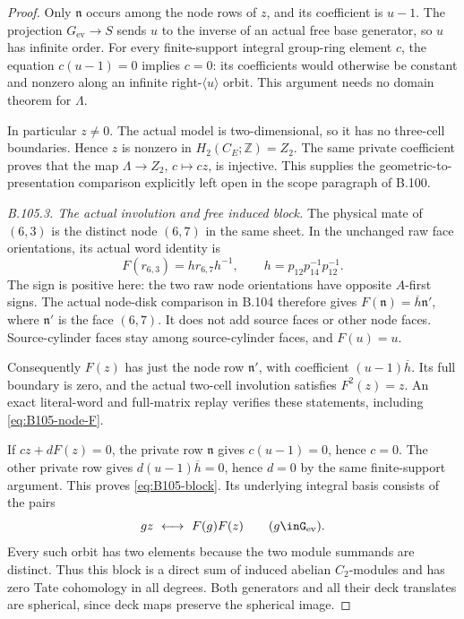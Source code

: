 \begin{proof}
Only $\mathfrak n$ occurs among the node rows of $z$, and its
coefficient is $u-1$. The projection $G_{\mathrm{ev}}\to S$ sends
$u$ to the inverse of an actual free base generator, so $u$
has infinite order. For every finite-support integral group-ring
element $c$, the equation $c(u-1)=0$ implies $c=0$: its
coefficients would otherwise be constant and nonzero along an
infinite right-$\langle u\rangle$ orbit. This argument needs
no domain theorem for $\Lambda$.

In particular $z\ne0$. The actual model is two-dimensional,
so it has no three-cell boundaries. Hence $z$ is nonzero in
$H_2(C_E;\mathbb Z)=Z_2$. The same private coefficient proves
that the map $\Lambda\to Z_2$, $c\mapsto cz$, is injective.
This supplies the geometric-to-presentation comparison explicitly
left open in the scope paragraph of B.100.

\emph{B.105.3. The actual involution and free induced block.}
The physical mate of $(6,3)$ is the distinct node $(6,7)$ in
the same sheet. In the unchanged raw face orientations, its
actual word identity is
\begin{equation}\label{eq:B105-node-F}
 F(r_{6,3})=h r_{6,7}h^{-1},\qquad
             h=p_{12}p_{14}^{-1}p_{12}^{-1}.
\end{equation}
The sign is positive here: the two raw node orientations have
opposite $A$-first signs. The actual node-disk comparison in
B.104 therefore gives $F(\mathfrak n)=\overline h\mathfrak n'$,
where $\mathfrak n'$ is the face $(6,7)$. It does not add source
faces or other node faces. Source-cylinder faces stay among
source-cylinder faces, and $F(u)=u$.

Consequently $F(z)$ has just the node row $\mathfrak n'$,
with coefficient $(u-1)\overline h$. Its full boundary is zero,
and the actual two-cell involution satisfies $F^2(z)=z$.
An exact literal-word and full-matrix replay verifies these
statements, including \eqref{eq:B105-node-F}.

If $c z+dF(z)=0$, the private row $\mathfrak n$ gives
$c(u-1)=0$, hence $c=0$. The other private row gives
$d(u-1)\overline h=0$, hence $d=0$ by the same finite-support
argument. This proves \eqref{eq:B105-block}. Its underlying
integral basis consists of the pairs
\[
       g z\ \longleftrightarrow\ F(g)F(z)
                 \qquad(g\inG_{\mathrm{ev}}).
\]
Every such orbit has two elements because the two module
summands are distinct. Thus this block is a direct sum of
induced abelian $C_2$-modules and has zero Tate cohomology in
all degrees. Both generators and all their deck translates are
spherical, since deck maps preserve the spherical image.


\end{proof}
